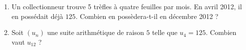 
\begin{exercice}\label{exosmath-0170}

    \begin{enumerate}
        \item
Un collectionneur trouve 5 trèfles à quatre feuilles par mois. En avril 2012, il en possédait déjà \( 125\). Combien en possèdera-t-il en décembre 2012 ?
            
        \item
            Soit \( (u_n)\) une suite arithmétique de raison \( 5\) telle que \( u_{4}=125\). Combien vaut \( u_{12}\) ?
    \end{enumerate}

\end{exercice}
